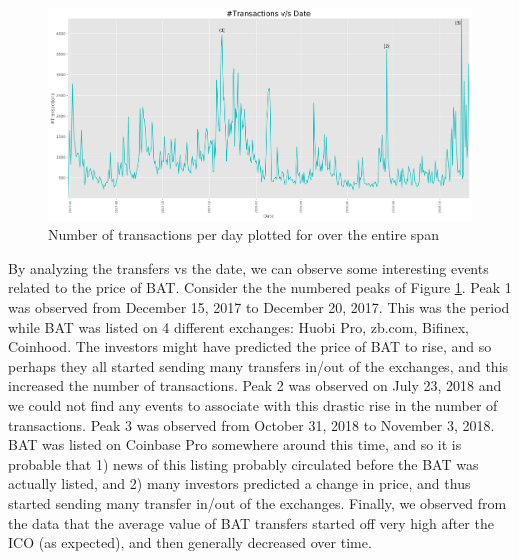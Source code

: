 \documentclass[sigconf]{acmart}
\begin{document}
\begin{figure}
\includegraphics[scale=0.0825]{number-of-Transactions-vs-Date.png}
\caption{Number of transactions per day plotted for over the entire span}
\label{fig:num-txs-vs-date}
\end{figure}
By analyzing the transfers vs the date, we can observe some interesting
events related to the price of BAT.
Consider the the numbered peaks of Figure \ref{fig:num-txs-vs-date}.
Peak 1 was observed from December 15, 2017 to December 20, 2017.
This was the period while BAT was listed on 4 different exchanges:
Huobi Pro, zb.com, Bifinex, Coinhood.
The investors might have predicted the price of BAT to
rise, and so perhaps they all started sending many transfers in/out of
the exchanges, and this increased the number of transactions.
Peak 2 was observed on July 23, 2018 and we could not find any events
to associate with this drastic rise in the number of transactions.
Peak 3 was observed from October 31, 2018 to November 3, 2018.
BAT was listed on Coinbase Pro somewhere around this time,
and so it is probable that
1) news of this listing probably circulated before the BAT was actually listed,
and 2) many investors predicted a change in price, and thus
started sending many transfer in/out of the exchanges.
Finally, we observed from the data that the average value of
BAT transfers started off very high after the ICO (as expected),
and then generally decreased over time.


\end{document}
